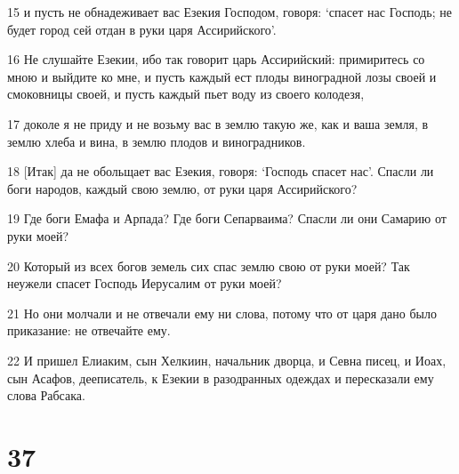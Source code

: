 \par 15 и пусть не обнадеживает вас Езекия Господом, говоря: `спасет нас Господь; не будет город сей отдан в руки царя Ассирийского'.
\par 16 Не слушайте Езекии, ибо так говорит царь Ассирийский: примиритесь со мною и выйдите ко мне, и пусть каждый ест плоды виноградной лозы своей и смоковницы своей, и пусть каждый пьет воду из своего колодезя,
\par 17 доколе я не приду и не возьму вас в землю такую же, как и ваша земля, в землю хлеба и вина, в землю плодов и виноградников.
\par 18 [Итак] да не обольщает вас Езекия, говоря: `Господь спасет нас'. Спасли ли боги народов, каждый свою землю, от руки царя Ассирийского?
\par 19 Где боги Емафа и Арпада? Где боги Сепарваима? Спасли ли они Самарию от руки моей?
\par 20 Который из всех богов земель сих спас землю свою от руки моей? Так неужели спасет Господь Иерусалим от руки моей?
\par 21 Но они молчали и не отвечали ему ни слова, потому что от царя дано было приказание: не отвечайте ему.
\par 22 И пришел Елиаким, сын Хелкиин, начальник дворца, и Севна писец, и Иоах, сын Асафов, дееписатель, к Езекии в разодранных одеждах и пересказали ему слова Рабсака.

\chapter{37}

